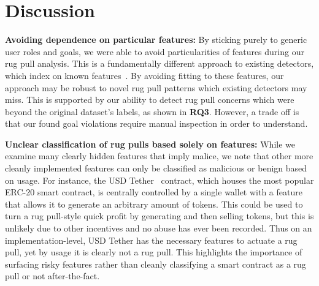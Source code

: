 \section{Discussion}
\label{ss:sec:discussion}


\smallskip
\noindent
\textbf{Avoiding dependence on particular features:}
By sticking purely to generic user roles and goals, we were able to avoid particularities of features during our rug pull analysis.
This is a fundamentally different approach to existing detectors, which index on known features~\cite{pied-piper,do-not-rug_math22}.
By avoiding fitting to these features, our approach may be robust to novel rug pull patterns which existing detectors may miss.
This is supported by our ability to detect rug pull concerns which were beyond the original dataset's labels, as shown in \textbf{RQ3}.
However, a trade off is that our found goal violations require manual inspection in order to understand.


\smallskip
\noindent
\textbf{Unclear classification of rug pulls based solely on features:}
While we examine many clearly hidden features that imply malice, we note that other more cleanly implemented features can only be classified as malicious or benign based on usage.
For instance, the USD Tether~\cite{TetherWhitepaper} contract, which houses the most popular ERC-20 smart contract, is centrally controlled by a single wallet with a  feature that allows it to generate an arbitrary amount of tokens.
This could be used to turn a rug pull-style quick profit by generating and then selling tokens, but this is unlikely due to other incentives and no abuse has ever been recorded.
Thus on an implementation-level, USD Tether has the necessary features to actuate a rug pull, yet by usage it is clearly not a rug pull.
This highlights the importance of surfacing risky features rather than cleanly classifying a smart contract as a rug pull or not after-the-fact.
